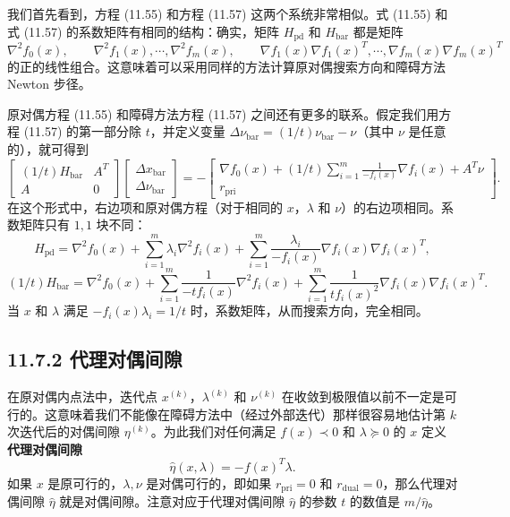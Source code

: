 \documentclass[UTF8, 12pt, fontset=fandol, oneside]{ctexart}
\begin{document}
我们首先看到，方程 (11.55) 和方程 (11.57) 这两个系统非常相似。式 (11.55) 和式 (11.57) 的系数矩阵有相同的结构：确实，矩阵 $H_{\mathrm{pd}}$ 和 $H_{\mathrm{bar}}$ 都是矩阵
\[
\nabla^2f_0(x),\qquad \nabla^2f_1(x),\cdots,\nabla^2f_m(x),\qquad
\nabla f_1(x)\nabla f_1(x)^T,\cdots,\nabla f_m(x)\nabla f_m(x)^T
\]
的正的线性组合。这意味着可以采用同样的方法计算原对偶搜索方向和障碍方法 Newton 步径。

原对偶方程 (11.55) 和障碍方法方程 (11.57) 之间还有更多的联系。假定我们用方程 (11.57) 的第一部分除 $t$，并定义变量 $\Delta\nu_{\mathrm{bar}}=(1/t)\nu_{\mathrm{bar}}-\nu$（其中 $\nu$ 是任意的），就可得到
\[
\begin{bmatrix}
(1/t)H_{\mathrm{bar}} & A^T\\
A & 0
\end{bmatrix}
\begin{bmatrix}
\Delta x_{\mathrm{bar}}\\
\Delta\nu_{\mathrm{bar}}
\end{bmatrix}
=-
\begin{bmatrix}
\nabla f_0(x)+(1/t)\sum_{i=1}^m\frac{1}{-f_i(x)}\nabla f_i(x)+A^T\nu\\
r_{\mathrm{pri}}
\end{bmatrix}.
\]
在这个形式中，右边项和原对偶方程（对于相同的 $x$，$\lambda$ 和 $\nu$）的右边项相同。系数矩阵只有 $1,1$ 块不同：
\[
H_{\mathrm{pd}}=\nabla^2f_0(x)+\sum_{i=1}^m\lambda_i\nabla^2f_i(x)+\sum_{i=1}^m\frac{\lambda_i}{-f_i(x)}\nabla f_i(x)\nabla f_i(x)^T,
\]
\[
(1/t)H_{\mathrm{bar}}=\nabla^2f_0(x)+\sum_{i=1}^m\frac{1}{-tf_i(x)}\nabla^2f_i(x)+\sum_{i=1}^m\frac{1}{tf_i(x)^2}\nabla f_i(x)\nabla f_i(x)^T.
\]
当 $x$ 和 $\lambda$ 满足 $-f_i(x)\lambda_i=1/t$ 时，系数矩阵，从而搜索方向，完全相同。

\subsection*{11.7.2 代理对偶间隙}

在原对偶内点法中，迭代点 $x^{(k)}$，$\lambda^{(k)}$ 和 $\nu^{(k)}$ 在收敛到极限值以前不一定是可行的。这意味着我们不能像在障碍方法中（经过外部迭代）那样很容易地估计第 $k$ 次迭代后的对偶间隙 $\eta^{(k)}$。为此我们对任何满足 $f(x)\prec 0$ 和 $\lambda\succeq 0$ 的 $x$ 定义\textbf{代理对偶间隙}
\begin{equation}
\hat{\eta}(x,\lambda)=-f(x)^T\lambda.
\tag{11.59}
\end{equation}
如果 $x$ 是原可行的，$\lambda,\nu$ 是对偶可行的，即如果 $r_{\mathrm{pri}}=0$ 和 $r_{\mathrm{dual}}=0$，那么代理对偶间隙 $\hat{\eta}$ 就是对偶间隙。注意对应于代理对偶间隙 $\hat{\eta}$ 的参数 $t$ 的数值是 $m/\hat{\eta}$。
\end{document}
